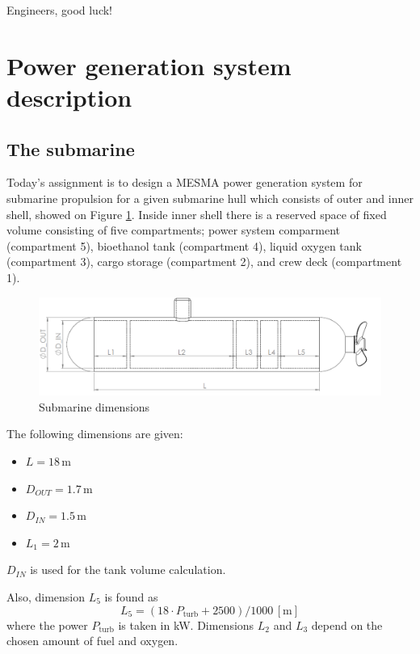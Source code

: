\documentclass{article}
\begin{document}
	Engineers, good luck!
		
	\newpage
	\section{Power generation system description}
	
	
	\subsection{The submarine}
	
	Today's assignment is to design a MESMA power generation system for 
	submarine propulsion for a given submarine hull which consists of outer and 
	inner shell, showed on Figure \ref{fig:side_view}. Inside inner shell 
	there is a reserved space of fixed volume consisting of five compartments;
	power system comparment (compartment 5), bioethanol tank (compartment 4), 
	liquid oxygen tank (compartment 3), cargo storage (compartment 2), and crew 
	deck (compartment 1).
	
	
	\begin{figure}[h!]
		\centering
		\includegraphics[width=\textwidth]{submarine_side_view.png}
		\caption{Submarine dimensions}
		\label{fig:side_view}
	\end{figure}
	
	The following dimensions are given:
	\begin{itemize}
		\item $L = 18 \,\textrm{m}$
		\item $D_{OUT} = 1.7 \,\textrm{m}$
		\item $D_{IN} = 1.5 \,\textrm{m}$
		\item $L_1 = 2 \,\textrm{m}$
	\end{itemize}
	
	$D_{IN}$  is used for the tank volume calculation.

	Also, dimension $L_5$ is found as
	\begin{equation}
		L_5 = (18 \cdot P_\textrm{turb} + 2500)/1000 \,\left[\textrm{m}\right]
	\end{equation}
	where the power $P_\textrm{turb}$ is taken in kW. Dimensions $L_2$ and 
	$L_3$ depend on the chosen amount of fuel and oxygen.
	
\end{document}
